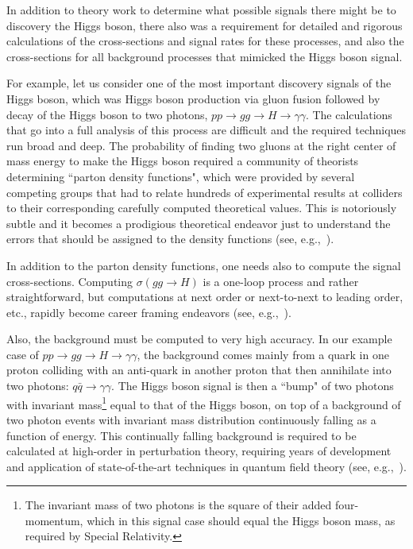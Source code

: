 \documentclass[letter,12pt]{article}
\begin{document}
In addition to theory work to determine what possible signals there might be to discovery the Higgs boson, there also was a requirement for detailed and rigorous calculations of the cross-sections and signal rates for these processes, and also the cross-sections for all background processes that mimicked the Higgs boson signal. 

For example, let us consider one of the most important discovery signals of the Higgs boson, which  was Higgs boson production via gluon fusion followed by decay of the Higgs boson to two photons, $pp\to gg\to H\to\gamma\gamma$.  The calculations that go into a full analysis of this process are difficult and the required techniques run broad and deep. The probability of finding two gluons at the right center of mass energy to make the Higgs boson required a community of theorists determining ``parton density functions", which were provided by several competing groups that had to relate hundreds of experimental results at colliders to their corresponding carefully computed theoretical values. This is notoriously subtle and it becomes a prodigious theoretical endeavor just to understand the errors that should be assigned to the density functions (see, e.g.,~\cite{Lai:2010nw}). 

In addition to the parton density functions, one needs also to compute the signal cross-sections. Computing $\sigma(gg\to H)$ is a one-loop process and rather straightforward, but computations at next order or next-to-next to leading order, etc., rapidly become career framing endeavors (see, e.g.,~\cite{Anastasiou:2012hx}).

Also, the background must be computed to very high accuracy. In our example case of $pp\to gg\to H\to \gamma\gamma$, the background comes mainly from a quark in one proton colliding with an anti-quark in another proton that then annihilate into two photons: $q\bar q\to \gamma\gamma$. The Higgs boson signal is then a ``bump" of two photons with invariant mass\footnote{The invariant mass of two photons is the square of their added four-momentum, which in this signal case should equal the Higgs boson mass, as required by Special Relativity.} equal to that of the Higgs boson, on top of a background of two photon events with invariant mass distribution continuously falling as a function of energy.  This continually falling background is required to be calculated at high-order in perturbation theory, requiring years of development and application of state-of-the-art techniques in quantum field theory (see, e.g.,~\cite{Bern:2001df}).
\end{document}
